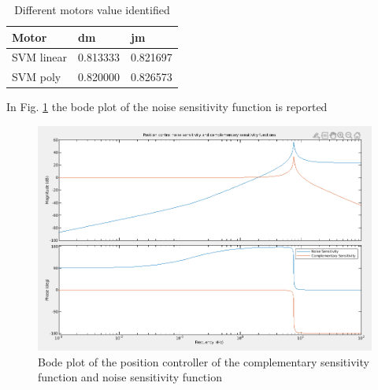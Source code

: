 \documentclass[a4paper,11pt]{article}
\begin{document}
\begin{table}[H]
  \begin{tabular}{ |p{6.5cm}||p{4cm}|p{4cm}| }
  \hline
  Motor& dm & jm  \\
  \hline
  SVM linear           &0.813333&   0.821697\\
  SVM poly             &0.820000&   0.826573\\
  \hline
\end{tabular}
\caption{Different motors value identified}
\label{tab:motors}
\end{table}

In Fig. \ref{fig:responses} the bode plot of the noise sensitivity function is reported

\begin{figure}[H]
\begin{center}
\includegraphics[width=1.0\textwidth]{images/responses.png}
\end{center}
\caption{Bode plot of the position controller of the complementary sensitivity function and noise sensitivity function}
\label{fig:responses}
\end{figure}
\end{document}

